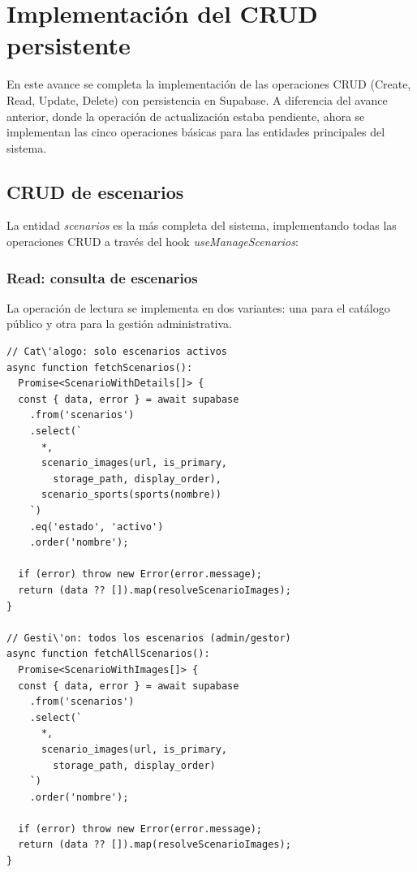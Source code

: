 
\section{Implementaci\'on del CRUD persistente}

En este avance se completa la implementaci\'on de las operaciones CRUD
(Create, Read, Update, Delete) con persistencia en Supabase. A diferencia
del avance anterior, donde la operaci\'on de actualizaci\'on estaba
pendiente, ahora se implementan las cinco operaciones b\'asicas
para las entidades principales del sistema.

\subsection{CRUD de escenarios}

La entidad \textit{scenarios} es la m\'as completa del sistema,
implementando todas las operaciones CRUD a trav\'es del hook
\textit{useManageScenarios}:

\subsubsection{Read: consulta de escenarios}

La operaci\'on de lectura se implementa en dos variantes: una para
el cat\'alogo p\'ublico y otra para la gesti\'on administrativa.

\begin{lstlisting}
// Cat\'alogo: solo escenarios activos
async function fetchScenarios():
  Promise<ScenarioWithDetails[]> {
  const { data, error } = await supabase
    .from('scenarios')
    .select(`
      *,
      scenario_images(url, is_primary,
        storage_path, display_order),
      scenario_sports(sports(nombre))
    `)
    .eq('estado', 'activo')
    .order('nombre');

  if (error) throw new Error(error.message);
  return (data ?? []).map(resolveScenarioImages);
}

// Gesti\'on: todos los escenarios (admin/gestor)
async function fetchAllScenarios():
  Promise<ScenarioWithImages[]> {
  const { data, error } = await supabase
    .from('scenarios')
    .select(`
      *,
      scenario_images(url, is_primary,
        storage_path, display_order)
    `)
    .order('nombre');

  if (error) throw new Error(error.message);
  return (data ?? []).map(resolveScenarioImages);
}
\end{lstlisting}

